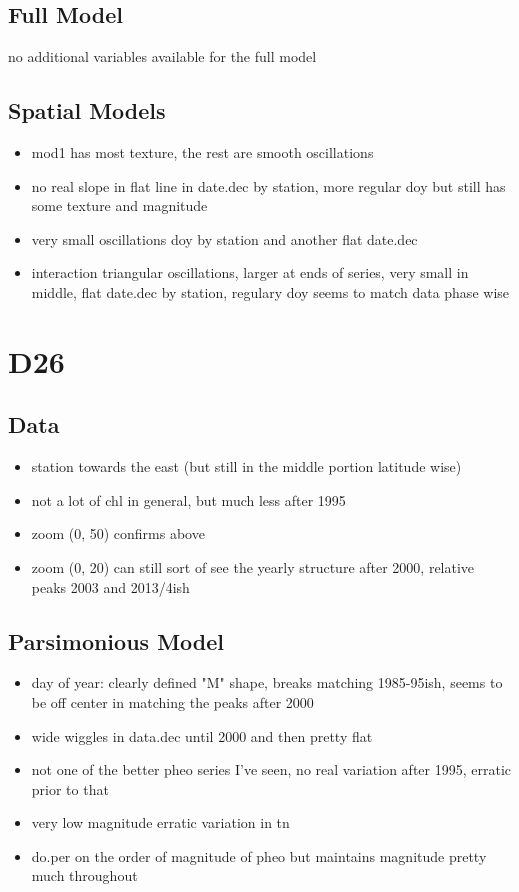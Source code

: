 \documentclass[12pt]{amsart}
\begin{document}
\subsection{Full Model}
\begin{itemize}
\ite no additional variables available for the full model
\end{itemize}

\subsection{Spatial Models}

\begin{itemize}
\item mod1 has most texture, the rest are smooth oscillations
\item no real slope in flat line in date.dec by station, more regular doy but still has some texture and magnitude
\item very small oscillations doy by station and another flat date.dec
\item interaction triangular oscillations, larger at ends of series, very small in middle, flat date.dec by station, regulary doy seems to match data phase wise
\end{itemize}

\section{D26}
\subsection{Data}
\begin{itemize}
\item station towards the east (but still in the middle portion latitude wise)
\item not a lot of chl in general, but much less after 1995
\item zoom (0, 50) confirms above
\item zoom (0, 20) can still sort of see the yearly structure after 2000, relative peaks 2003 and 2013/4ish
\end{itemize}
\subsection{Parsimonious Model}
\begin{itemize}
\item day of year: clearly defined "M" shape, breaks matching 1985-95ish, seems to be off center in matching the peaks after 2000
\item wide wiggles in data.dec until 2000 and then pretty flat
\item not one of the better pheo series I've seen, no real variation after 1995, erratic prior to that
\item very low magnitude erratic variation in tn
\item do.per on the order of magnitude of pheo but maintains magnitude pretty much throughout
\end{itemize}
\end{document}
